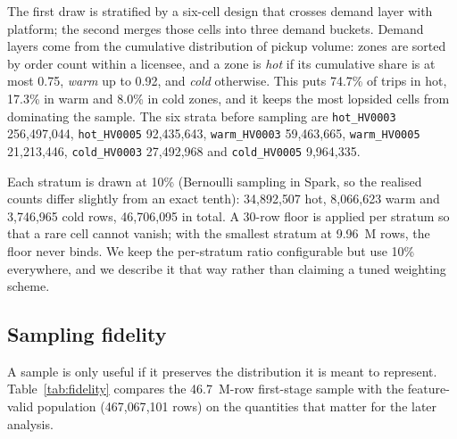 \documentclass[11pt,a4paper]{article}
\newcommand{\code}[1]{\texttt{\small #1}}
\begin{document}
The first draw is stratified by a six-cell design that crosses demand layer with platform; the second merges those cells into three demand buckets. Demand layers come from the cumulative distribution of pickup volume: zones are sorted by order count within a licensee, and a zone is \emph{hot} if its cumulative share is at most 0.75, \emph{warm} up to 0.92, and \emph{cold} otherwise. This puts 74.7\% of trips in hot, 17.3\% in warm and 8.0\% in cold zones, and it keeps the most lopsided cells from dominating the sample. The six strata before sampling are \code{hot\_HV0003} 256{,}497{,}044, \code{hot\_HV0005} 92{,}435{,}643, \code{warm\_HV0003} 59{,}463{,}665, \code{warm\_HV0005} 21{,}213{,}446, \code{cold\_HV0003} 27{,}492{,}968 and \code{cold\_HV0005} 9{,}964{,}335.

Each stratum is drawn at 10\% (Bernoulli sampling in Spark, so the realised counts differ slightly from an exact tenth): 34{,}892{,}507 hot, 8{,}066{,}623 warm and 3{,}746{,}965 cold rows, 46{,}706{,}095 in total. A 30-row floor is applied per stratum so that a rare cell cannot vanish; with the smallest stratum at 9.96~M rows, the floor never binds. We keep the per-stratum ratio configurable but use 10\% everywhere, and we describe it that way rather than claiming a tuned weighting scheme.

\subsection{Sampling fidelity}

A sample is only useful if it preserves the distribution it is meant to represent. Table~\ref{tab:fidelity} compares the 46.7~M-row first-stage sample with the feature-valid population (467{,}067{,}101 rows) on the quantities that matter for the later analysis.
\end{document}
